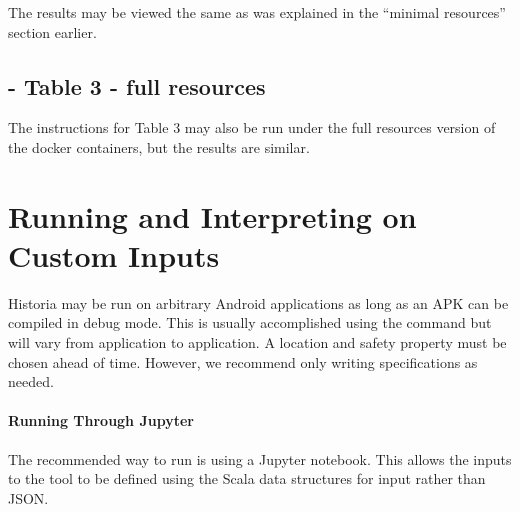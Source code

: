 \documentclass{article} %
\begin{document}
The results may be viewed the same as was explained in the ``minimal resources'' section earlier.


\subsection{ - Table 3 - full resources}

The instructions for Table 3 may also be run under the full resources version of the docker containers, but the results are similar.

\iffalse
\section{Running and Interpreting \toolname on Custom Inputs}

Historia may be run on arbitrary Android applications as long as an APK can be compiled in debug mode.  This is usually accomplished using the command  but will vary from application to application. A location and safety property must be chosen ahead of time.  However, we recommend only writing \newls specifications as needed.

\paragraph{Running \toolname Through Jupyter}
The recommended way to run \toolname is using a Jupyter notebook.  This allows the inputs to the tool to be defined using the Scala data structures for input rather than JSON.






\end{document}
